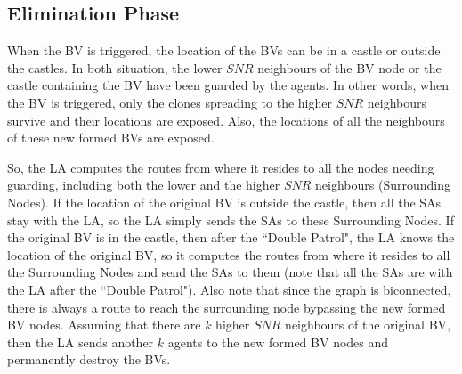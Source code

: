 \subsection{ Elimination Phase}

When the BV is triggered,   the location of the BVs can be in a castle or outside the castles. In both situation, the lower $SNR$ neighbours of the BV node or the castle containing the BV have been guarded by the agents. In other words, when the BV is triggered, only the clones spreading to the higher $SNR$ neighbours %
survive and their locations are exposed. Also, the locations of all the neighbours of these new formed BVs are exposed. 

So, the LA computes the routes from where it resides to all the nodes needing guarding, including both  the lower and the higher $SNR$ neighbours   (Surrounding Nodes). If the location of the original BV is outside the castle, then all the SAs stay  with the LA, so the LA simply sends the SAs to these Surrounding Nodes. If the original BV is in the castle, then after the  ``Double Patrol", the LA knows the location of the original BV, so it computes the routes from where it resides to all the Surrounding Nodes and send the SAs to them (note that all the SAs are with the LA after the  ``Double Patrol"). Also note that since the graph is biconnected, there is always a route to reach the surrounding node bypassing the new formed BV nodes. 
Assuming that there are $k$ higher $SNR$ neighbours of the original BV, then   the LA sends another $k$ agents to the new formed BV nodes and permanently destroy the BVs.
   


  









































 